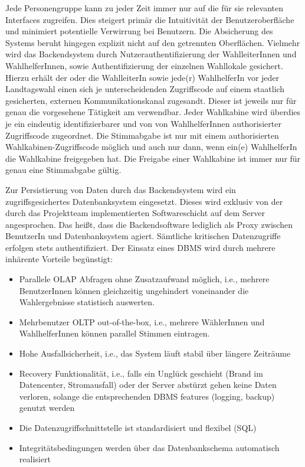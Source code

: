 \documentclass[a4paper,12pt]{article}
\begin{document}
Jede Personengruppe kann zu jeder Zeit immer nur auf die für sie relevanten Interfaces zugreifen.
Dies steigert primär die Intuitivität der Benutzeroberfläche und minimiert potentielle Verwirrung
bei Benutzern. Die Absicherung des Systems beruht hingegen explizit nicht auf den getrennten 
Oberflächen. Vielmehr wird das Backendsystem durch Nutzerauthentifizierung der WahlleiterInnen und 
WahlhelferInnen, sowie Authentifizierung der einzelnen Wahllokale gesichert. Hierzu erhält der oder die 
WahlleiterIn sowie jede(r) WahlhelferIn vor jeder Landtagswahl einen sich je unterscheidenden 
Zugriffscode auf einem staatlich gesicherten, externen Kommunikationskanal zugesandt. Dieser
ist jeweils nur für genau die vorgesehene Tätigkeit am verwendbar. Jeder Wahlkabine wird
überdies je ein eindeutig identifizierbarer und von von WahlhelferInnen authorisierter Zugriffscode
zugeordnet. Die Stimmabgabe ist nur mit einem authorisierten Wahlkabinen-Zugriffscode möglich und auch
nur dann, wenn ein(e) WahlhelferIn die Wahlkabine freigegeben hat. Die Freigabe einer Wahlkabine
ist immer nur für genau eine Stimmabgabe gültig.

Zur Persistierung von Daten durch das Backendsystem wird ein zugriffsgesichertes Datenbanksystem eingesetzt. Dieses
wird exklusiv von der durch das Projektteam implementierten Softwareschicht auf dem Server angesprochen.
Das heißt, dass die Backendsoftware lediglich als Proxy zwischen BenutzerIn und Datenbanksystem agiert. Sämtliche 
kritischen Datenzugriffe erfolgen stets authentifiziert.
%
Der Einsatz eines DBMS wird durch mehrere inhärente Vorteile begünstigt:

\begin{itemize}
      \item Parallele OLAP Abfragen ohne Zusatzaufwand möglich, i.e., mehrere BenutzerInnen können 
            gleichzeitig ungehindert voneinander die Wahlergebnisse statistisch auswerten.
      \item Mehrbenutzer OLTP out-of-the-box, i.e., mehrere WählerInnen und WahlhelferInnen können parallel Stimmen
            eintragen.
      \item Hohe Ausfallsicherheit, i.e., das System läuft stabil über längere Zeiträume
      \item Recovery Funktionalität, i.e., falls ein Unglück geschieht (Brand im Datencenter, Stromausfall) 
            oder der Server abstürzt gehen keine Daten verloren, solange die entsprechenden DBMS features 
            (logging, backup) genutzt werden
      \item Die Datenzugriffschnittstelle ist standardisiert und flexibel (SQL)
      \item Integritätsbedingungen werden über das Datenbankschema automatisch realisiert
\end{itemize}
\end{document}
